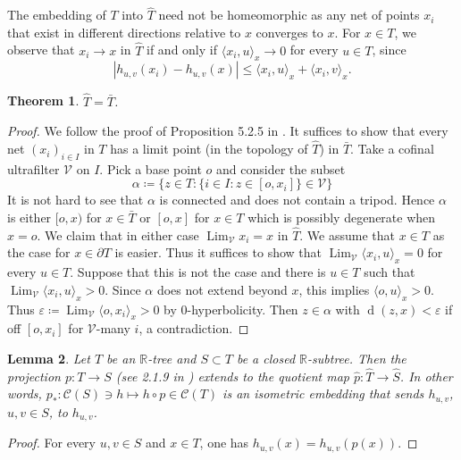 \documentclass[12pt,nosumlimits,nonamelimits]{amsart}
\newtheorem{thm}{Theorem}
\newtheorem{lem}[thm]{Lemma}
\theoremstyle{remark}
\theoremstyle{definition}
\newcommand{\IR}{\mathbb{R}}
\newcommand{\cC}{\mathcal{C}}
\newcommand{\cV}{\mathcal{V}}
\newcommand{\ve}{\varepsilon}
\DeclareMathOperator{\Lim}{Lim}
\DeclareMathOperator{\dist}{d}
\newcommand{\ip}[1]{\mathopen{\langle}#1\mathclose{\rangle}}
\begin{document}
The embedding of $T$ into $\hat{T}$ need not be homeomorphic as 
any net of points $x_i$ that exist in different directions relative to 
$x$ converges to $x$. 
For $x\in T$, we observe that $x_i\to x$ in $\hat{T}$ 
if and only if $\ip{x_i,u}_x\to0$ for every $u\in T$, since 
%
\[
|h_{u,v}(x_i) - h_{u,v}(x)| \le \ip{x_i,u}_x+\ip{x_i,v}_x. 
\]

\begin{thm} $\hat{T} = \bar{T}$. 
\end{thm}
\begin{proof}
We follow the proof of Proposition 5.2.5 in \cite{bo}.
It suffices to show that every net $(x_i)_{i\in I}$ 
in $T$ has a limit point (in the topology of $\hat{T}$) in $\bar{T}$.
Take a cofinal ultrafilter $\cV$ on $I$.
Pick a base point $o$ and consider the subset 
\[
\alpha \coloneq \{ z\in T : \{ i \in I : z \in  [o,x_i] \}\in\cV \}
\]
It is not hard to see that $\alpha$ is connected 
and does not contain a tripod. 
Hence $\alpha$ is either $[o,x)$ for $x\in \bar{T}$ 
or $[o,x]$ for $x\in T$ which is possibly degenerate 
when $x=o$. 
We claim that in either case $\Lim_\cV x_i = x$ in $\hat{T}$.  
We assume that $x\in T$ 
as the case for $x\in\partial T$ is easier. 
Thus it suffices to show that 
$\Lim_\cV\ip{x_i,u}_x=0$ for every $u\in T$. 
Suppose that this is not the case and  
there is $u\in T$ such that $\Lim_\cV\ip{x_i,u}_x>0$. 
Since $\alpha$ does not extend beyond $x$, this implies 
$\ip{o,u}_x > 0$. 
Thus $\ve \coloneq \Lim_\cV \ip{o,x_i}_x >0$ by $0$-hyper\-bolicity. 
Then $z \in \alpha$ with $\dist(z,x) < \ve$ 
if off $[o,x_i]$ for $\cV$-many $i$, a contradiction. 
\end{proof}

\begin{lem}\label{lem:treeemb1}
Let $T$ be an $\IR$-tree and $S\subset T$ be 
a closed $\IR$-subtree.
Then the projection $p\colon T\to S$ (see 2.1.9 in \cite{chiswell}) 
extends to the quotient map $\hat{p}\colon \hat{T} \to \hat{S}$. 
In other words, 
$p_*\colon \cC(S) \ni h\mapsto h\circ p \in \cC(T)$ 
is an isometric embedding that 
sends $h_{u,v}$, $u,v\in S$, to $h_{u,v}$. 
\end{lem}
\begin{proof}
For every $u,v\in S$ and $x\in T$, one has $h_{u,v}(x) = h_{u,v}(p(x))$. 
\end{proof}
\end{document}
